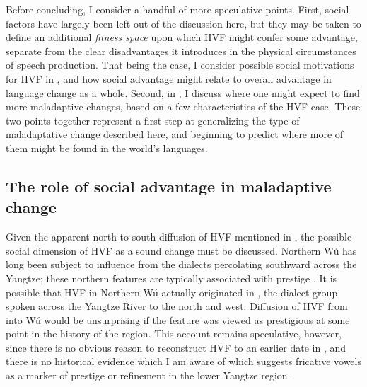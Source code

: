 \documentclass[output=paper,hidelinks]{langscibook}
\begin{document}
Before concluding, I consider a handful of more speculative points. First, social factors have largely been left out of the discussion here, but they may be taken to define an additional \textit{fitness space} upon which HVF might confer some advantage, separate from the clear disadvantages it introduces in the physical circumstances of speech production.
%
That being the case, I consider possible social motivations for HVF in , and how social advantage might relate to overall advantage in language change as a whole. Second, in , I discuss where one might expect to find more maladaptive changes, based on a few characteristics of the HVF case. These two points together represent a first step at generalizing the type of maladaptative change described here, and beginning to predict where more of them might be found in the world's languages.

\subsection{The role of social advantage in maladaptive change}\label{sec:faytak:5.1}


Given the apparent north-to-south diffusion of HVF mentioned in , the  possible social dimension of HVF as a sound change must be discussed. Northern Wú has long been subject to influence from the  dialects percolating southward across the Yangtze; these northern features are typically associated with prestige \citep{norman-chinese, ramsey}. It is possible that HVF in Northern Wú actually originated in  , the  dialect group spoken across the Yangtze River to the north and west. Diffusion of HVF from   into Wú would be unsurprising if the feature was viewed as prestigious at some point in the history of the region. This account remains speculative, however, since there is no obvious reason to reconstruct HVF to an earlier date in   
\citep[see][]{coblin}, and there is no historical evidence which I am aware of which suggests fricative vowels as a marker of prestige or refinement in the lower Yangtze region.  
\end{document}
